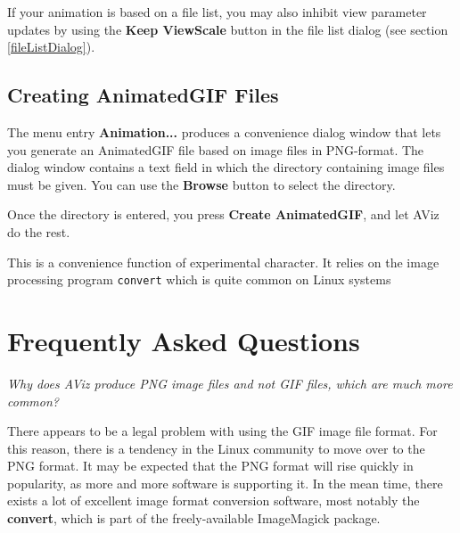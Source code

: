 \documentclass[11pt]{article}
\begin{document}
If your animation is based on a file list, you may also inhibit view parameter 
updates by using the {\bf Keep ViewScale} button in the file list dialog 
(see section \ref{fileListDialog}).

\subsection{Creating AnimatedGIF Files}
\label{creatingAnimatedGIF}
The menu entry {\bf Animation...} produces a convenience dialog window that 
lets you generate an AnimatedGIF file based on image files in PNG-format.  
The dialog window contains a text field in which the directory containing
image files must be given.  You can use the {\bf Browse} button to select
the directory.  

Once the directory is entered, you press {\bf Create AnimatedGIF}, and let AViz
do the rest.  

This is a convenience function of experimental character.  It relies on the
image processing program {\tt convert} which is quite common on Linux systems

\section{Frequently Asked Questions}

{\em Why does AViz produce PNG image files and not GIF files, which are much 
more common?}

There appears to be a legal problem with using the GIF image file format.  
For this reason, there is a tendency in the Linux community to move over 
to the PNG format.  It may be expected that the PNG format will rise 
quickly in popularity, as more and more software is supporting it.  In the 
mean time, there exists a lot of excellent image format conversion software, 
most notably the {\bf convert}, which is part of the freely-available 
ImageMagick package.
\end{document}
